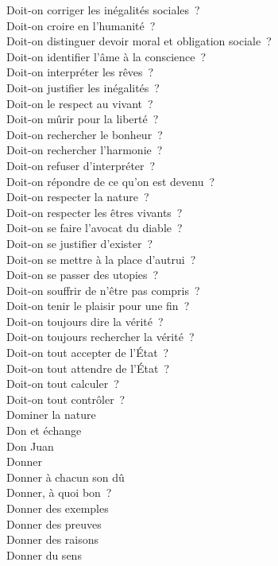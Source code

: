 \documentclass[a4paper,12pt]{article}
\begin{document}
Doit-on corriger les inégalités sociales ? \\
Doit-on croire en l'humanité ? \\
Doit-on distinguer devoir moral et obligation sociale ? \\
Doit-on identifier l'âme à la conscience ? \\
Doit-on interpréter les rêves ? \\
Doit-on justifier les inégalités ? \\
Doit-on le respect au vivant ? \\
Doit-on mûrir pour la liberté ? \\
Doit-on rechercher le bonheur ? \\
Doit-on rechercher l'harmonie ? \\
Doit-on refuser d'interpréter ? \\
Doit-on répondre de ce qu'on est devenu ? \\
Doit-on respecter la nature ? \\
Doit-on respecter les êtres vivants ? \\
Doit-on se faire l'avocat du diable ? \\
Doit-on se justifier d'exister ? \\
Doit-on se mettre à la place d'autrui ? \\
Doit-on se passer des utopies ? \\
Doit-on souffrir de n'être pas compris ? \\
Doit-on tenir le plaisir pour une fin ? \\
Doit-on toujours dire la vérité ? \\
Doit-on toujours rechercher la vérité ? \\
Doit-on tout accepter de l'État ? \\
Doit-on tout attendre de l'État ? \\
Doit-on tout calculer ? \\
Doit-on tout contrôler ? \\
Dominer la nature \\
Don et échange \\
Don Juan \\
Donner \\
Donner à chacun son dû \\
Donner, à quoi bon ? \\
Donner des exemples \\
Donner des preuves \\
Donner des raisons \\
Donner du sens \\
\end{document}
